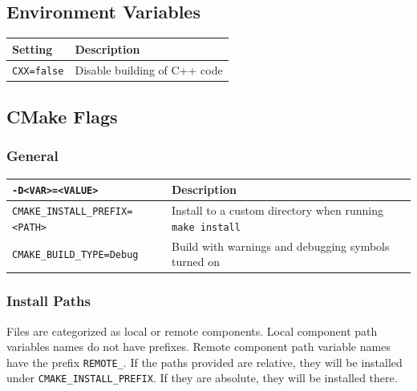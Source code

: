 \subsection{Environment Variables}
\begin{table}[h!]
\centering
\begin{tabularx}{1.2\textwidth}{| l | X |}
  \hline
  Setting & Description \\
  \hline
  \texttt{CXX=false} & Disable building of C++ code \\
  \hline
\end{tabularx}
\end{table}

\subsection{CMake Flags}

\subsubsection{General}
\begin{table}[h!]
\centering
\begin{tabularx}{1.2\textwidth}{| l | X |}
  \hline
  \texttt{-D<VAR>=<VALUE>} & Description \\
  \hline
  \texttt{CMAKE\_INSTALL\_PREFIX=<PATH>}
  & Install to a custom directory when running \texttt{make install} \\
  \hline
  \texttt{CMAKE\_BUILD\_TYPE=Debug}
  & Build with warnings and debugging symbols turned on \\
  \hline
\end{tabularx}
\end{table}

\subsubsection{Install Paths}
Files are categorized as local or remote components. Local component
path variables names do not have prefixes. Remote component path
variable names have the prefix \texttt{REMOTE\_}.  If the paths
provided are relative, they will be installed under
\texttt{CMAKE\_INSTALL\_PREFIX}. If they are absolute, they will be
installed there.

